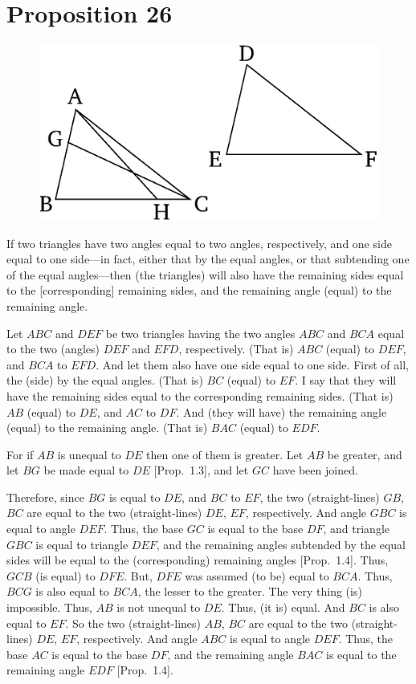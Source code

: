 \chapter*{Proposition 26}

\begin{figure}[ht]
    \begin{center}
    \includegraphics[width=0.5\linewidth]{figures/fig26e.eps}
    \label{fig:prop_26}
    \end{center}
\end{figure}


If  two triangles have two angles equal to two angles, respectively, 
and one side equal to one side---in fact, either that by the equal angles, or that
subtending one of the equal angles---then (the triangles) will also have the remaining
sides equal to the [corresponding] remaining sides, and the
remaining angle (equal) to the remaining angle.

Let $ABC$ and $DEF$ be two triangles having the two angles $ABC$ and
$BCA$ equal to the two (angles) $DEF$ and $EFD$, respectively.
(That is) $ABC$ (equal) to $DEF$, and $BCA$ to $EFD$. And let them also have
one side equal to one side. First of all, the (side) by the equal angles. (That is)
$BC$ (equal) to $EF$. I say that they will have the  remaining sides equal to the
corresponding remaining sides. (That is) $AB$ (equal) to $DE$, and $AC$ to
$DF$. And (they will have) the remaining angle (equal) to the remaining angle.
(That is) $BAC$ (equal) to $EDF$.

For if $AB$ is unequal to $DE$ then one of them is greater. Let $AB$ be greater,
and let $BG$ be made equal to $DE$ [Prop.~1.3], and let $GC$ have been
joined.

Therefore, since $BG$ is equal to $DE$, and $BC$ to $EF$, the two (straight-lines)
$GB$, $BC$ are equal to the two (straight-lines) $DE$, $EF$, respectively. And angle
$GBC$ is equal to angle $DEF$. Thus, the base $GC$ is equal to the base $DF$,
and triangle $GBC$ is equal to triangle $DEF$, and the remaining angles 
subtended by the equal sides will
be equal to the (corresponding) remaining angles [Prop.~1.4].
Thus, $GCB$ (is equal) to $DFE$. But,  $DFE$ was assumed (to be) equal to $BCA$.
Thus, $BCG$ is also equal to $BCA$, the lesser to the greater. The very thing (is) impossible. Thus, $AB$ is not unequal to $DE$. Thus, (it is) equal. And $BC$ is
also equal to $EF$. So the two (straight-lines) $AB$, $BC$ are equal to the two (straight-lines) $DE$, $EF$, respectively. And angle $ABC$ is equal to
angle $DEF$. Thus, the base $AC$ is equal to the base $DF$, and the remaining
angle $BAC$ is equal to the remaining angle $EDF$ [Prop.~1.4].

